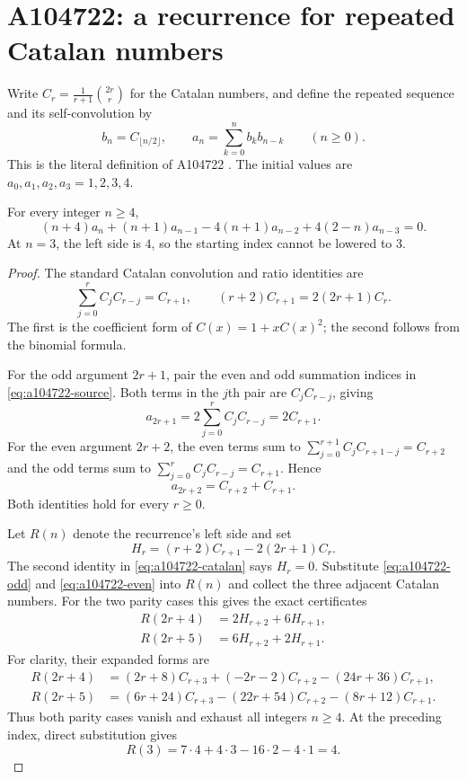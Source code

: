 \section{A104722: a recurrence for repeated Catalan numbers}

Write $C_r=\frac1{r+1}\binom{2r}{r}$ for the Catalan numbers, and
define the repeated sequence and its self-convolution by
\begin{equation}\label{eq:a104722-source}
 b_n=C_{\lfloor n/2\rfloor},\qquad
 a_n=\sum_{k=0}^{n}b_kb_{n-k}\qquad(n\ge0).
\end{equation}
This is the literal definition of A104722 \cite{a104722-source}.
The initial values are $a_0,a_1,a_2,a_3=1,2,3,4$.

\begin{theorem}\label{thm:a104722}
For every integer $n\ge4$,
\[
 (n+4)a_n+(n+1)a_{n-1}
 -4(n+1)a_{n-2}+4(2-n)a_{n-3}=0.
\]
At $n=3$, the left side is $4$, so the starting index cannot be
lowered to $3$.
\end{theorem}

\begin{proof}
The standard Catalan convolution and ratio identities are
\begin{equation}\label{eq:a104722-catalan}
 \sum_{j=0}^{r}C_jC_{r-j}=C_{r+1},\qquad
 (r+2)C_{r+1}=2(2r+1)C_r.
\end{equation}
The first is the coefficient form of $C(x)=1+xC(x)^2$;
the second follows from the binomial formula.

For the odd argument $2r+1$, pair the even and odd summation
indices in \eqref{eq:a104722-source}. Both terms in the $j$th
pair are $C_jC_{r-j}$, giving
\begin{equation}\label{eq:a104722-odd}
 a_{2r+1}=2\sum_{j=0}^{r}C_jC_{r-j}=2C_{r+1}.
\end{equation}
For the even argument $2r+2$, the even terms sum to
$\sum_{j=0}^{r+1}C_jC_{r+1-j}=C_{r+2}$ and the odd terms sum to
$\sum_{j=0}^{r}C_jC_{r-j}=C_{r+1}$. Hence
\begin{equation}\label{eq:a104722-even}
 a_{2r+2}=C_{r+2}+C_{r+1}.
\end{equation}
Both identities hold for every $r\ge0$.

Let $R(n)$ denote the recurrence's left side and set
\[
 H_r=(r+2)C_{r+1}-2(2r+1)C_r.
\]
The second identity in \eqref{eq:a104722-catalan} says $H_r=0$.
Substitute \eqref{eq:a104722-odd} and \eqref{eq:a104722-even}
into $R(n)$ and collect the three adjacent Catalan numbers.
For the two parity cases this gives the exact certificates
\begin{align*}
 R(2r+4)&=2H_{r+2}+6H_{r+1},\\
 R(2r+5)&=6H_{r+2}+2H_{r+1}.
\end{align*}
For clarity, their expanded forms are
\[
\begin{aligned}
R(2r+4)
 &=(2r+8)C_{r+3}+(-2r-2)C_{r+2}-(24r+36)C_{r+1},\\
R(2r+5)
 &=(6r+24)C_{r+3}-(22r+54)C_{r+2}-(8r+12)C_{r+1}.
\end{aligned}
\]
Thus both parity cases vanish and exhaust all integers $n\ge4$.
At the preceding index, direct substitution gives
\[
 R(3)=7\cdot4+4\cdot3-16\cdot2-4\cdot1=4.
\]
\end{proof}

